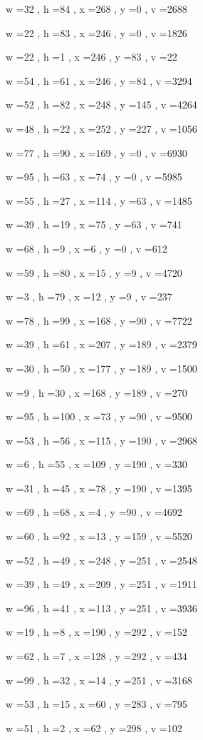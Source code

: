 \documentclass[11pt]{article}
\begin{document}
w =32 , h =84 , x =268 , y =0 , v =2688
\par
w =22 , h =83 , x =246 , y =0 , v =1826
\par
w =22 , h =1 , x =246 , y =83 , v =22
\par
w =54 , h =61 , x =246 , y =84 , v =3294
\par
w =52 , h =82 , x =248 , y =145 , v =4264
\par
w =48 , h =22 , x =252 , y =227 , v =1056
\par
w =77 , h =90 , x =169 , y =0 , v =6930
\par
w =95 , h =63 , x =74 , y =0 , v =5985
\par
w =55 , h =27 , x =114 , y =63 , v =1485
\par
w =39 , h =19 , x =75 , y =63 , v =741
\par
w =68 , h =9 , x =6 , y =0 , v =612
\par
w =59 , h =80 , x =15 , y =9 , v =4720
\par
w =3 , h =79 , x =12 , y =9 , v =237
\par
w =78 , h =99 , x =168 , y =90 , v =7722
\par
w =39 , h =61 , x =207 , y =189 , v =2379
\par
w =30 , h =50 , x =177 , y =189 , v =1500
\par
w =9 , h =30 , x =168 , y =189 , v =270
\par
w =95 , h =100 , x =73 , y =90 , v =9500
\par
w =53 , h =56 , x =115 , y =190 , v =2968
\par
w =6 , h =55 , x =109 , y =190 , v =330
\par
w =31 , h =45 , x =78 , y =190 , v =1395
\par
w =69 , h =68 , x =4 , y =90 , v =4692
\par
w =60 , h =92 , x =13 , y =159 , v =5520
\par
w =52 , h =49 , x =248 , y =251 , v =2548
\par
w =39 , h =49 , x =209 , y =251 , v =1911
\par
w =96 , h =41 , x =113 , y =251 , v =3936
\par
w =19 , h =8 , x =190 , y =292 , v =152
\par
w =62 , h =7 , x =128 , y =292 , v =434
\par
w =99 , h =32 , x =14 , y =251 , v =3168
\par
w =53 , h =15 , x =60 , y =283 , v =795
\par
w =51 , h =2 , x =62 , y =298 , v =102
\par
\newpage
\end{document}
